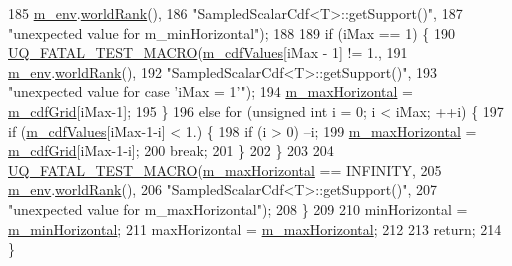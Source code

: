 \begin{DoxyCode}
185                         \hyperlink{class_q_u_e_s_o_1_1_base_scalar_cdf_a3caa986ae1ccef96a28b0365fb88c86c}{m\_env}.\hyperlink{class_q_u_e_s_o_1_1_base_environment_a78b57112bbd0e6dd0e8afec00b40ffa7}{worldRank}(),
186                         \textcolor{stringliteral}{"SampledScalarCdf<T>::getSupport()"},
187                         \textcolor{stringliteral}{"unexpected value for m\_minHorizontal"});
188 
189     \textcolor{keywordflow}{if} (iMax == 1) \{
190       \hyperlink{_defines_8h_a56d63d18d0a6d45757de47fcc06f574d}{UQ\_FATAL\_TEST\_MACRO}(\hyperlink{class_q_u_e_s_o_1_1_sampled_scalar_cdf_ab8cf649637f31cc75c9f676d5927c10f}{m\_cdfValues}[iMax - 1] != 1.,
191                           \hyperlink{class_q_u_e_s_o_1_1_base_scalar_cdf_a3caa986ae1ccef96a28b0365fb88c86c}{m\_env}.\hyperlink{class_q_u_e_s_o_1_1_base_environment_a78b57112bbd0e6dd0e8afec00b40ffa7}{worldRank}(),
192                           \textcolor{stringliteral}{"SampledScalarCdf<T>::getSupport()"},
193                           \textcolor{stringliteral}{"unexpected value for case 'iMax = 1'"});
194       \hyperlink{class_q_u_e_s_o_1_1_base_scalar_cdf_a33beb9b7e610a4fe1458080593982d2e}{m\_maxHorizontal} = \hyperlink{class_q_u_e_s_o_1_1_sampled_scalar_cdf_a58d6744bac9ce8d906839bf381517f4a}{m\_cdfGrid}[iMax-1];
195     \}
196     \textcolor{keywordflow}{else} \textcolor{keywordflow}{for} (\textcolor{keywordtype}{unsigned} \textcolor{keywordtype}{int} i = 0; i < iMax; ++i) \{
197       \textcolor{keywordflow}{if} (\hyperlink{class_q_u_e_s_o_1_1_sampled_scalar_cdf_ab8cf649637f31cc75c9f676d5927c10f}{m\_cdfValues}[iMax-1-i] < 1.) \{
198         \textcolor{keywordflow}{if} (i > 0) --i;
199         \hyperlink{class_q_u_e_s_o_1_1_base_scalar_cdf_a33beb9b7e610a4fe1458080593982d2e}{m\_maxHorizontal} = \hyperlink{class_q_u_e_s_o_1_1_sampled_scalar_cdf_a58d6744bac9ce8d906839bf381517f4a}{m\_cdfGrid}[iMax-1-i];
200         \textcolor{keywordflow}{break};
201       \}
202     \}
203 
204     \hyperlink{_defines_8h_a56d63d18d0a6d45757de47fcc06f574d}{UQ\_FATAL\_TEST\_MACRO}(\hyperlink{class_q_u_e_s_o_1_1_base_scalar_cdf_a33beb9b7e610a4fe1458080593982d2e}{m\_maxHorizontal} == INFINITY,
205                         \hyperlink{class_q_u_e_s_o_1_1_base_scalar_cdf_a3caa986ae1ccef96a28b0365fb88c86c}{m\_env}.\hyperlink{class_q_u_e_s_o_1_1_base_environment_a78b57112bbd0e6dd0e8afec00b40ffa7}{worldRank}(),
206                         \textcolor{stringliteral}{"SampledScalarCdf<T>::getSupport()"},
207                         \textcolor{stringliteral}{"unexpected value for m\_maxHorizontal"});
208   \}
209 
210   minHorizontal = \hyperlink{class_q_u_e_s_o_1_1_base_scalar_cdf_ab54be9623cddb0671db458d05d63f0a7}{m\_minHorizontal};
211   maxHorizontal = \hyperlink{class_q_u_e_s_o_1_1_base_scalar_cdf_a33beb9b7e610a4fe1458080593982d2e}{m\_maxHorizontal};
212 
213   \textcolor{keywordflow}{return};
214 \}
\end{DoxyCode}
